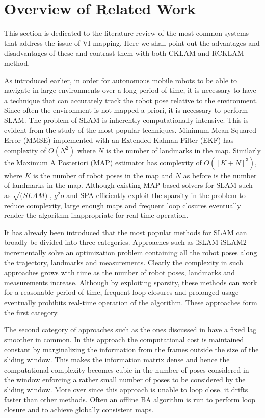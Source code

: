 \section{Overview of Related Work}
This section is dedicated to the literature review of the most common systems that address the issue of VI-mapping. Here we shall point out the advantages and disadvantages of these and contrast them with both CKLAM and RCKLAM method.
 
As introduced earlier, in order for autonomous mobile robots to be able to navigate in large environments over a long period of time, it is necessary to have a technique that can accurately track the robot pose relative to the environment. Since often the environment is not mapped a priori, it is necessary to perform SLAM. The problem of SLAM is inherently computationally intensive. This is evident from the study of the most popular techniques. Minimum Mean Squared Error (MMSE)\cite{EkFSLAM} implemented with an Extended Kalman Filter (EKF) has complexity of $O(N^2)$ where $N$ is the number of landmarks in the map. Similarly the Maximum A Posteriori (MAP) estimator \cite{FULL-BA-BASED} has complexity of $O([K+N]^3)$, where $K$ is the number of robot poses in the map and $N$ as before is the number of landmarks in the map. Although existing MAP-based solvers for SLAM such as $\sqrt(SLAM)$ \cite{FULL-BA-BASED}, $g^2o$\cite{g2o} and SPA \cite{spaBYkonolige} efficiently exploit the sparsity in the problem to reduce complexity, large enough maps and frequent loop closures eventually render the algorithm inappropriate for real time operation.

It has already been introduced that the most popular methods for SLAM can broadly be divided into three categories. Approaches such as iSLAM \cite{Kaess08thesis} iSLAM2 \cite{Kaess01022012} incrementally solve an optimization problem containing all the robot poses along the trajectory, landmarks and measurements. Clearly the complexity in such approaches grows with time as the number of robot poses, landmarks and measurements increase. Although by exploiting sparsity, these methods can work for a reasonable period of time, frequent loop closures and prolonged usage eventually prohibits real-time operation of the algorithm. These approaches form the first category.

The second category of approaches such as the ones discussed in \cite {Sibley:2010, 4801600} have a fixed lag smoother in common. In this approach the computational cost is maintained constant by marginalizing the information from the frames outside the size of the sliding window. This makes the information matrix dense and hence the computational complexity becomes cubic in the number of poses considered in the window enforcing a rather small number of poses to be considered by the sliding window. More over since this approach is unable to loop close, it drifts faster than other methods. Often an offline BA algorithm is run to perform loop closure and to achieve globally consistent maps.

